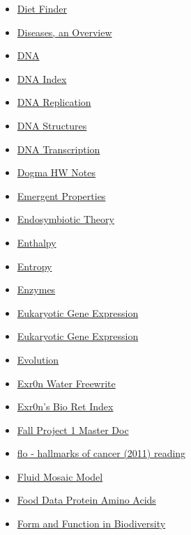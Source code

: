 \documentclass[11pt]{article}
\begin{document}
\begin{itemize}
\begin{itemize}
\begin{itemize}
\item \href{biology/bio10/KBe20bio201retDietFinderIndex.org}{Diet Finder}
\item \href{biology/bio10/KBhBIO101Diseases.org}{Diseases, an Overview}
\item \href{biology/bio10/KBe2020bio101refProtienFoldingConflict.org}{DNA}
\item \href{biology/bio10/KBe20bio101refDNA.org}{DNA Index}
\item \href{biology/bio10/KBhBIO101DNAReplication.org}{DNA Replication}
\item \href{biology/bio10/KBhBIO101DNAStructures.org}{DNA Structures}
\item \href{biology/bio10/KBhBIO101DNATranscription.org}{DNA Transcription}
\item \href{biology/bio10/KBBIO101DogmaNuecleotidesNotes.org}{Dogma HW Notes}
\item \href{biology/bio10/KB20200826090938.org}{Emergent Properties}
\item \href{biology/bio10/KBhBIO101Endosymbiotic.org}{Endosymbiotic Theory}
\item \href{biology/bio10/KBhBIO101Enthalpy.org}{Enthalpy}
\item \href{biology/bio10/KBhBIO101Entropy.org}{Entropy}
\item \href{biology/bio10/KBhBIO101Enzymes.org}{Enzymes}
\item \href{biology/bio10/KBBIO101GeneExpression.org}{Eukaryotic Gene Expression}
\item \href{biology/bio10/KBBIO101GeneExpression2.org}{Eukaryotic Gene Expression}
\item \href{biology/bio10/KBhBIO101Evolution.org}{Evolution}
\item \href{biology/bio10/KBe20bio101retWaterFreewrite.org}{Exr0n Water Freewrite}
\item \href{biology/bio10/KBe20bio101retIndex.org}{Exr0n's Bio Ret Index}
\item \href{biology/bio10/KBe20bio201retFallProject1.org}{Fall Project 1 Master Doc}
\item \href{biology/bio10/KBe21bio201floHallmarksOfCancer.org}{flo - hallmarks of cancer (2011) reading}
\item \href{biology/bio10/KBhBIO101FluidMosaic.org}{Fluid Mosaic Model}
\item \href{biology/bio10/KBe20bio101retFoodDataProteinAminos.org}{Food Data Protein Amino Acids}
\item \href{biology/bio10/KBhBIO101Rosalind.org}{Form and Function in Biodiversity}

\end{itemize}
\end{itemize}
\end{itemize}
\end{document}
